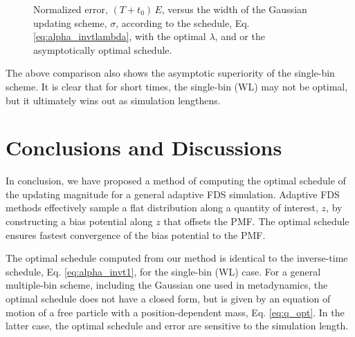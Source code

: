 \documentclass[reprint, floatfix]{revtex4-1}
\begin{document}
\begin{figure}[h]
\begin{center}
  \caption{
    \label{fig:err_sigscan}
    Normalized error, $(T + t_0) \, E$,
    versus the width of the Gaussian updating scheme,
    $\sigma$,
    according to the schedule,
    Eq. \eqref{eq:alpha_invtlambda},
    with the optimal $\lambda$,
    and or the asymptotically optimal schedule.
  }
\end{center}
\end{figure}






The above comparison also shows the asymptotic superiority
of the single-bin scheme.
It is clear that for short times,
the single-bin (WL) may not be optimal,
but it ultimately wins out as simulation lengthens.

%
%


\section{\label{sec:conclusion}
Conclusions and Discussions}



In conclusion,
we have proposed a method of computing
the optimal schedule of the updating magnitude
for a general adaptive FDS simulation.
%
Adaptive FDS methods
effectively sample a flat distribution
along a quantity of interest, $z$,
by constructing a bias potential along $z$
that offsets the PMF.
%
The optimal schedule ensures fastest convergence
of the bias potential to the PMF.


The optimal schedule computed from our method
is identical to the inverse-time schedule,
Eq. \eqref{eq:alpha_invt1},
for the single-bin (WL) case.
%
For a general multiple-bin scheme,
including the Gaussian one used in metadynamics,
the optimal schedule does not have a closed form,
but is given by an equation of motion
of a free particle with a position-dependent mass, Eq. \eqref{eq:q_opt}.
%
In the latter case,
the optimal schedule and error
are sensitive to the simulation length.
\end{document}
